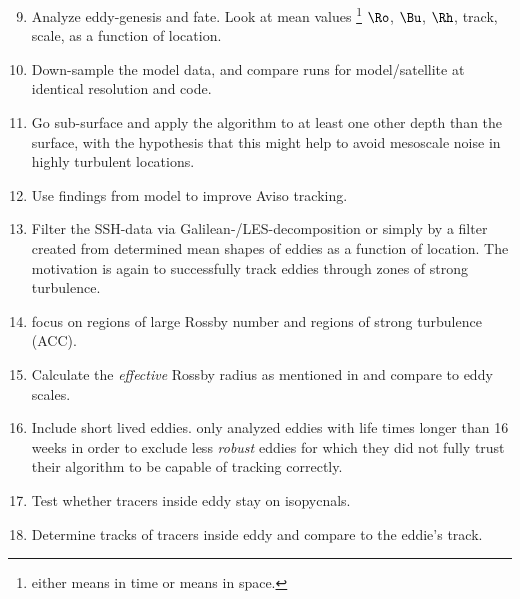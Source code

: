 \begin{enumerate}
\setcounter{enumi}{8}
\item
Analyze eddy-genesis and fate. Look at mean values \footnote{either means in time or means in space.} $\Ro$, $\Bu$, $\Rh$, track, scale, as a function of location.

\item
Down-sample the model data, and compare runs for model/satellite at identical
resolution and code.

\item
Go sub-surface and apply the algorithm to at least one other depth than the surface, with the hypothesis that this might help to avoid mesoscale noise in highly turbulent locations.

\item
Use findings from model to improve Aviso tracking.
\item
Filter the SSH-data via Galilean-/LES-decomposition \cite{Adrian2000a} or simply
by a filter created from determined mean shapes of eddies as a function of
location. The motivation is again to successfully track eddies through zones of
strong turbulence.

\item
focus on regions of large Rossby number and regions of strong turbulence (ACC).

\item
Calculate the \emph{effective} Rossby radius as mentioned in \cite{Vollmer2013a} and compare to eddy scales.

\item
Include short lived eddies. \cite{Chelton2011} only analyzed eddies with life times longer than 16 weeks in order to exclude less \textit{robust} eddies for which they did not fully trust their algorithm to be capable of tracking correctly.

\item
Test whether tracers inside eddy stay on isopycnals.

\item
Determine tracks of tracers inside eddy and compare to the eddie's track.


\end{enumerate}
